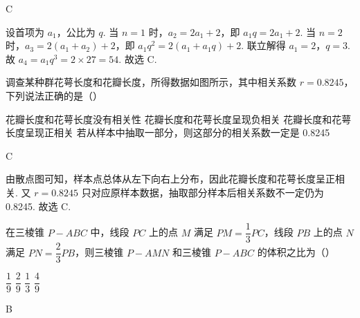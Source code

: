 \begin{answer}
C
\end{answer}

\begin{solution}
设首项为 \(a_1\)，公比为 \(q\). 当 \(n=1\) 时，\(a_2=2a_1+2\)，即 \(a_1q=2a_1+2\).
当 \(n=2\) 时，\(a_3=2(a_1+a_2)+2\)，即 \(a_1q^2=2(a_1+a_1q)+2\). 联立解得 \(a_1=2\)，\(q=3\). 故 \(a_4=a_1q^3=2\times 27=54\). 故选 C.
\end{solution}

\begin{problem}
调查某种群花萼长度和花瓣长度，所得数据如图所示，其中相关系数 \(r=0.8245\)，下列说法正确的是（\quad）


\choices
    {花瓣长度和花萼长度没有相关性}
    {花瓣长度和花萼长度呈现负相关}
    {花瓣长度和花萼长度呈现正相关}
    {若从样本中抽取一部分，则这部分的相关系数一定是 0.8245}
\end{problem}

\begin{answer}
C
\end{answer}

\begin{solution}
由散点图可知，样本点总体从左下向右上分布，因此花瓣长度和花萼长度呈正相关. 又 \(r=0.8245\) 只对应原样本数据，抽取部分样本后相关系数不一定仍为 0.8245. 故选 C.
\end{solution}

\begin{problem}
在三棱锥 \(P-ABC\) 中，线段 \(PC\) 上的点 \(M\) 满足 \(PM=\dfrac{1}{3}PC\)，线段 \(PB\) 上的点 \(N\) 满足 \(PN=\dfrac{2}{3}PB\)，则三棱锥 \(P-AMN\) 和三棱锥 \(P-ABC\) 的体积之比为（\quad）

\choices
    {\(\dfrac{1}{9}\)}
    {\(\dfrac{2}{9}\)}
    {\(\dfrac{1}{3}\)}
    {\(\dfrac{4}{9}\)}
\end{problem}

\begin{answer}
B
\end{answer}

